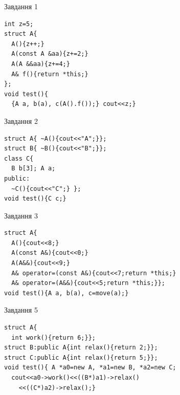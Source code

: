 \documentclass[12pt, ukrainian]{article}
\begin{document}
{{{{{{{{{{{{{{{{{\begin{minipage}[t]{11cm}
{\begin{center}Завдання {1}\end{center}}
\vspace{-6mm}

\begin{verbatim}
int z=5;
struct A{
  A(){z++;}
  A(const A &aa){z+=2;}
  A(A &&aa){z+=4;}
  A& f(){return *this;}
};
void test(){
  {A a, b(a), c(A().f());} cout<<z;}
\end{verbatim}            


               
{\begin{center}Завдання {2}\end{center}}
\vspace{-6mm}

\begin{verbatim}
struct A{ ~A(){cout<<"A";}};
struct B{ ~B(){cout<<"B";}};
class C{
  B b[3]; A a;
public:
  ~C(){cout<<"C";} };
void test(){C c;}
\end{verbatim}            


               
{\begin{center}Завдання {3}\end{center}}
\vspace{-6mm}

\begin{verbatim}
struct A{
  A(){cout<<8;}
  A(const A&){cout<<0;}
  A(A&&){cout<<9;}
  A& operator=(const A&){cout<<7;return *this;}
  A& operator=(A&&){cout<<5;return *this;}};
void test(){A a, b(a), c=move(a);}
\end{verbatim}            


               
{\begin{center}Завдання {5}\end{center}}
\vspace{-6mm}

\begin{verbatim}
struct A{
  int work(){return 6;}};
struct B:public A{int relax(){return 2;}};
struct C:public A{int relax(){return 5;}};
void test(){ A *a0=new A, *a1=new B, *a2=new C;
  cout<<a0->work()<<((B*)a1)->relax()
    <<((C*)a2)->relax();}
\end{verbatim}            


\end{minipage}
\vline \hspace{8mm}
\begin{minipage}[t]{7cm}
               

\end{minipage}}}}}}}}}}}}}}}}}}
\end{document}
